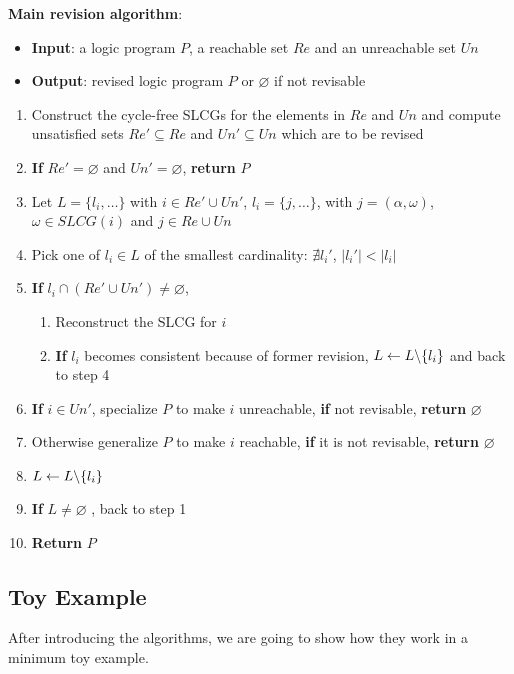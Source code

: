     \textbf{Main revision algorithm}:
    \begin{itemize}
        \item \textbf{Input}: a logic program $P$, a reachable set $Re$ and an unreachable set $Un$
        \item \textbf{Output}: revised logic program $P$ or $\varnothing$ if not revisable
    \end{itemize}
    \begin{enumerate}
        \item Construct the cycle-free SLCGs for the elements in $Re$ and $Un$ and compute unsatisfied sets $Re'\subseteq Re$ and $Un'\subseteq Un$ which are to be revised
        \item \textbf{If} $Re'=\varnothing$ and $Un'=\varnothing$, \textbf{return} $P$
        \item Let $L=\{l_i,\ldots\}$ with $i\in Re' \cup Un'$, $l_i=\{j,\ldots\}$, with $j=(\alpha,\omega)$, $\omega \in SLCG(i)$ and $ j\in Re\cup Un$ \label{step:dependency}
        \item Pick one of $l_i\in L$ of the smallest cardinality: $\nexists l_i'$, $|l_i'| < |l_i|$ \label{step:cardinality}
        \item \textbf{If} $l_i\cap (Re'\cup Un')\neq\varnothing$, \label{step:check}
        \begin{enumerate}
            \item Reconstruct the SLCG for $i$
            \item \textbf{If} $l_i$ becomes consistent because of former revision, $L\gets L\miset{l_i}$ and back to step 4
        \end{enumerate}
        \item \textbf{If} $i\in Un'$, specialize $P$ to make $i$ unreachable, \textbf{if} not revisable, \textbf{return} $\varnothing$ \label{step:specialize}
        \item Otherwise generalize $P$ to make $i$ reachable, \textbf{if} it is not revisable, \textbf{return} $\varnothing$ \label{step:generalize}
        
        \item $L\gets L\miset{l_i}$ \label{step:update}
        \item \textbf{If} $L\neq\varnothing$ , back to step 1 \label{step:recheck}
        \item \textbf{Return} $P$
    \end{enumerate} 
    

    
\subsection{Toy Example}    
After introducing the algorithms, we are going to show how they work in a minimum toy example.

